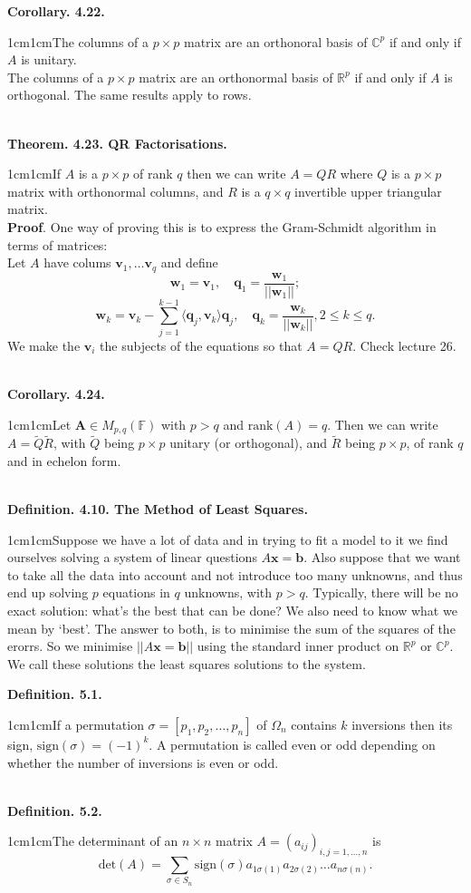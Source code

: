 \documentclass{article}
\newcommand{\vect}[1]{\mathbf{#1}}
\newcommand{\definition}[2]{\textbf{Definition. #1.}\begin{adjustwidth}{1cm}{1cm}#2\end{adjustwidth}}
\newcommand{\theorem}[2]{\textbf{Theorem. #1.}\begin{adjustwidth}{1cm}{1cm}#2\end{adjustwidth}}
\newcommand{\corollary}[2]{\textbf{Corollary. #1.}\begin{adjustwidth}{1cm}{1cm}#2\end{adjustwidth}}
\begin{document}
\corollary{4.22}{The columns of a $p \times p$ matrix are an orthonoral basis of $\mathbb{C}^p$ if and only if $A$ is unitary.\\The columns of a $p \times p$ matrix are an orthonormal basis of $\mathbb{R}^p$ if and only if $A$ is orthogonal. The same results apply to rows.}~\\
\theorem{4.23. QR Factorisations}{If $A$ is a $p \times p$ of rank $q$ then we can write $A = QR$ where $Q$ is a $p \times p$ matrix with orthonormal columns, and $R$ is a $q \times q$ invertible upper triangular matrix.\\[1\baselineskip]\textbf{Proof}. One way of proving this is to express the Gram-Schmidt algorithm in terms of matrices:\\Let $A$ have colums $\vect{v}_1, \ldots \vect{v}_q$ and define
\[ \vect{w}_1 = \vect{v}_1, \quad \vect{q}_1 = \frac{\vect{w}_1}{||\vect{w}_1||}; \]
\[ \vect{w}_k = \vect{v}_k - \sum_{j=1}^{k-1} \langle \vect{q}_j, \vect{v}_k \rangle \vect{q}_j, \quad \vect{q}_k = \frac{\vect{w}_k}{||\vect{w}_k||}, 2 \leq k \leq q. \]
We make the $\vect{v}_i$ the subjects of the equations so that $A = QR$. Check lecture 26.}~\\
\corollary{4.24}{Let $\vect{A} \in M_{p,q}(\mathbb{F})$ with $p > q$ and $\text{rank}(A) = q$. Then we can write $A = \tilde{Q}\tilde{R}$, with $\tilde{Q}$ being $p \times p$ unitary (or orthogonal), and $\tilde{R}$ being $p \times p$, of rank $q$ and in echelon form.}~\\
\definition{4.10. The Method of Least Squares}{Suppose we have a lot of data and in trying to fit a model to it we find ourselves solving a system of linear questions $A\vect{x} = \vect{b}$. Also suppose that we want to take all the data into account and not introduce too many unknowns, and thus end up solving $p$ equations in $q$ unknowns, with $p > q$. Typically, there will be no exact solution: what's the best that can be done? We also need to know what we mean by `best'. The answer to both, is to minimise the sum of the squares of the erorrs. So we minimise $||A\vect{x} = \vect{b}||$ using the standard inner product on $\mathbb{R}^p$ or $\mathbb{C}^p$. We call these solutions the least squares solutions to the system.}\newpage
\definition{5.1}{If a permutation $\sigma = [p_1, p_2, \ldots, p_n]$ of $\Omega_n$ contains $k$ inversions then its sign, $\text{sign}(\sigma) = (-1)^k$. A permutation is called even or odd depending on whether the number of inversions is even or odd.}~\\
\definition{5.2}{The determinant of an $n \times n$ matrix $A = (a_{ij})_{i,j=1,\ldots ,n}$ is \[\text{det}(A) = \sum_{\sigma \in S_n} \text{sign}(\sigma)a_{1 \sigma (1)} a_{2\sigma(2)} \ldots a_{n \sigma (n)}.\]}~\\
\end{document}
